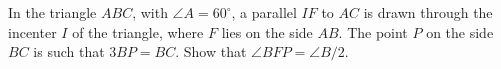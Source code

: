 In the triangle $ABC$, with $\angle A = 60^\circ$, a parallel $IF$ to $AC$ is drawn through the incenter $I$ of the triangle, where $F$ lies on the side $AB$. The point $P$ on the side $BC$ is such that $3BP = BC$. Show that $\angle BFP = \angle B/2$.
